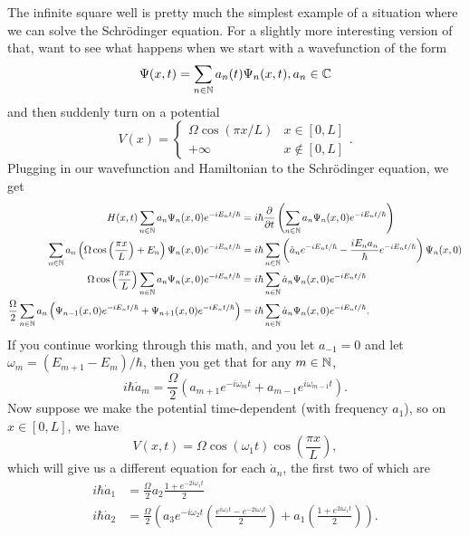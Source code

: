\documentclass{article}
\begin{document}
The infinite square well is pretty much the simplest example of a situation where we can solve the Schrödinger equation. For a slightly more interesting version of that, want to see what happens when we start with a wavefunction of the form
\[ \Psi(x,t) = \sum_{n \in \mathbb{N}} a_n(t) \Psi_n(x, t), a_n \in \mathbb{C} \]
and then suddenly turn on a potential
\[ V(x) = \begin{cases}
    \Omega \cos (\pi x /L) & x \in [0, L] \\
    +\infty & x \not\in [0, L]
\end{cases}. \]
Plugging in our wavefunction and Hamiltonian to the Schrödinger equation, we get
\begin{align*}
    H(x, t) \sum_{n \in \mathbb{N}} a_n \Psi_n(x, 0) e^{-i E_n t / \hbar} &= i \hbar \frac{\partial}{\partial t} \left( \sum_{n \in \mathbb{N}} a_n \Psi_n(x, 0) e^{-i E_n t / \hbar} \right) \\
\sum_{n \in \mathbb{N}} a_n \left( \Omega \cos \left( \frac{\pi x}{L} \right) + E_n \right) \Psi_n(x, 0) e^{-i E_n t / \hbar} &= i \hbar \sum_{n \in \mathbb{N}} \left( \dot{a}_n e^{-i E_n t / \hbar} - \frac{iE_na_n}{\hbar} e^{-iE_nt/\hbar} \right) \Psi_n(x, 0) \\
\Omega \cos \left( \frac{\pi x}{L} \right) \sum_{n \in \mathbb{N}} a_n \Psi_n(x, 0) e^{-iE_nt/\hbar} &= i \hbar \sum_{n \in \mathbb{N}} \dot{a}_n \Psi_n(x, 0) e^{-iE_nt/\hbar} \\
    \frac{\Omega}{2} \sum_{n \in \mathbb{N}} a_n \left( \Psi_{n-1}(x, 0) e^{-iE_nt/\hbar} + \Psi_{n+1}(x, 0) e^{-iE_nt/\hbar} \right) &= i \hbar \sum_{n \in \mathbb{N}} \dot{a}_n \Psi_n(x, 0) e^{-iE_nt/\hbar}.
\end{align*}
If you continue working through this math, and you let $a_{-1}=0$ and let $\omega_m = (E_{m+1}-E_m)/\hbar$, then you get that for any $m \in \mathbb{N}$,
\[ i \hbar \dot{a}_m = \frac{\Omega}{2} \left( a_{m+1} e^{-i\omega_m t} + a_{m-1} e^{i\omega_{m-1}t} \right).  \]
Now suppose we make the potential time-dependent (with frequency $a_1$), so on $x \in [0,L]$, we have
\[ V(x, t) = \Omega \cos(\omega_1 t) \cos \left( \frac{\pi x}{L} \right), \]
which will give us a different equation for each $\dot{a}_n$, the first two of which are
\begin{align*}
    i\hbar \dot{a}_1 &= \frac{\Omega}{2} a_2 \frac{1+e^{-2i\omega_1t}}{2} \\
    i\hbar \dot{a}_2 &= \frac{\Omega}{2} \left( a_3 e^{-i\omega_2t} \left( \frac{e^{i\omega_1t}-e^{-2i\omega_1t}}{2}\right) + a_1 \left( \frac{1+e^{2i\omega_1t}}{2} \right) \right).
\end{align*}
\end{document}
